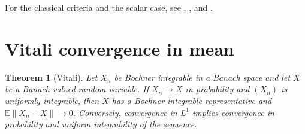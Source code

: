 \documentclass[11pt,oneside,openany]{book}
\theoremstyle{plain}
\newtheorem{theorem}{Theorem}[chapter]
\theoremstyle{definition}
\theoremstyle{remark}
\begin{document}
\noindent
For the classical criteria and the scalar case, see
\cite[Chapter 13]{Williams},
\cite[Lemma 5.10]{Kallenberg}, and
\cite[Chapter 3, Section 5, Theorem 5.6]{Shorack}.

\section{Vitali convergence in mean}
\label{p207:W32}

\begin{theorem}[Vitali]
Let \(X_n\) be Bochner integrable in a Banach space and let \(X\) be
a Banach-valued random variable. If \(X_n\to X\) in probability and
\((X_n)\) is uniformly integrable, then \(X\) has a Bochner-integrable
representative and \(\mathbb E\lVert X_n-X\rVert\to0\).
Conversely, convergence in \(L^1\) implies convergence in probability
and uniform integrability of the sequence.
\end{theorem}
\end{document}
